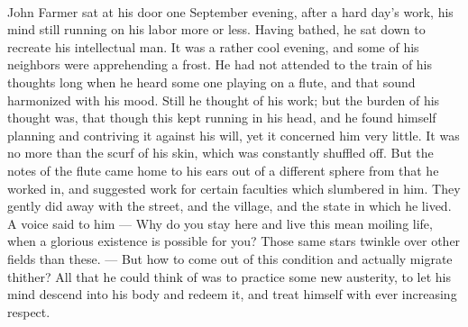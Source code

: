 \documentclass[letterpaper,12pt]{article}
\begin{document}
\paragraph{} John Farmer sat at his door one September evening, after a hard
day's work, his mind still running on his labor more or less. Having bathed, he
sat down to recreate his intellectual man. It was a rather cool evening, and
some of his neighbors were apprehending a frost. He had not attended to the
train of his thoughts long when he heard some one playing on a flute, and that
sound harmonized with his mood. Still he thought of his work; but the burden of
his thought was, that though this kept running in his head, and he found himself
planning and contriving it against his will, yet it concerned him very little.
It was no more than the scurf of his skin, which was constantly shuffled off.
But the notes of the flute came home to his ears out of a different sphere from
that he worked in, and suggested work for certain faculties which slumbered in
him. They gently did away with the street, and the village, and the state in
which he lived. A voice said to him --- Why do you stay here and live this mean
moiling life, when a glorious existence is possible for you? Those same stars
twinkle over other fields than these. --- But how to come out of this condition
and actually migrate thither? All that he could think of was to practice some
new austerity, to let his mind descend into his body and redeem it, and treat
himself with ever increasing respect.
\end{document}
